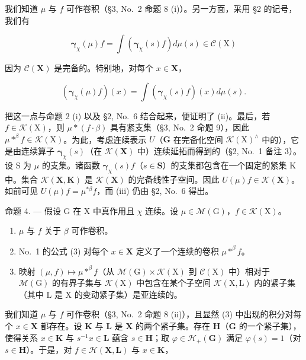 我们知道 \(\mu\) 与 \(f\) 可作卷积（§3, No.~2 命题 8 (i)）。另一方面，采用 §2 的记号，我们有

\[
\boldsymbol {\gamma} _ {\chi} (\mu) f = \int \left(\boldsymbol {\gamma} _ {\chi} (s) f\right) d \mu (s) \in \mathcal {C} (\mathrm{X})
\]

因为 \(\mathcal{C}(\mathbf{X})\) 是完备的。特别地，对每个 \(x\in \mathbf{X}\)，

\[
\left(\boldsymbol {\gamma} _ {\chi} (\mu) f\right) (x) = \int \left(\boldsymbol {\gamma} _ {\chi} (s) f\right) (x) d \mu (s).
\]

把这一点与命题 2 (i) 以及 §2, No.~6 结合起来，便证明了 (ii)。最后，若 \(f \in \mathcal{K}(\mathrm{X})\)，则 \(\mu * (f \cdot \beta)\) 具有紧支集（§3, No.~2 命题 9），因此 \(\mu *^{\beta} f \in \mathcal{K}(\mathrm{X})\)。为此，考虑连续表示 \(U\)（\(\mathbf{G}\) 在完备化空间 \(\mathcal{K}(\mathrm{X})^{\wedge}\) 中的），它是由连续算子 \(\pmb{\gamma}_{\chi}(s)\)（在 \(\mathcal{K}(\mathbf{X})\) 中）连续延拓而得到的（§2, No.~1 备注 3）。设 S 为 \(\mu\) 的支集。诸函数 \(\pmb{\gamma}_{\chi}(s)f\)（\(s \in \mathbf{S}\)）的支集都包含在一个固定的紧集 K 中。集合 \(\mathcal{K}(\mathbf{X}, \mathbf{K})\) 是 \(\mathcal{K}(\mathbf{X})\) 的完备线性子空间。因此 \(U(\mu)f \in \mathcal{K}(\mathbf{X})\)。如前可见 \(U(\mu)f = \mu^{*\beta}f\)，而 (iii) 仍由 §2, No.~6 得出。

命题 4. --- 假设 G 在 X 中真作用且 \(\chi\) 连续。设 \(\mu \in \mathcal{M}(\mathrm{G})\)，\(f \in \mathcal{K}(\mathrm{X})\)。

\begin{enumerate}
\def\labelenumi{(\roman{enumi})}
\item
  \(\mu\) 与 \(f\) 关于 \(\beta\) 可作卷积。
\item
  No.~1 的公式 (3) 对每个 \(x \in \mathbf{X}\) 定义了一个连续的卷积 \(\mu *^{\beta}f\)。
\item
  映射 \((\mu, f) \mapsto \mu *^{\beta}f\)（从 \(\mathcal{M}(\mathrm{G}) \times \mathcal{K}(\mathrm{X})\) 到 \(\mathcal{C}(\mathrm{X})\) 中）相对于 \(\mathcal{M}(\mathrm{G})\) 的有界子集与 \(\mathcal{K}(\mathrm{X})\) 中包含在某个子空间 \(\mathcal{K}(\mathrm{X}, \mathrm{L})\) 内的紧子集（其中 \(\mathrm{L}\) 是 \(\mathrm{X}\) 的变动紧子集）是亚连续的。
\end{enumerate}

我们知道 \(\mu\) 与 \(f\) 可作卷积（§3, No.~2 命题 8 (ii)），且显然 (3) 中出现的积分对每个 \(x \in \mathbf{X}\) 都存在。设 \(\mathbf{K}\) 与 \(\mathbf{L}\) 是 \(\mathbf{X}\) 的两个紧子集。存在 \(\mathbf{H}\)（\(\mathbf{G}\) 的一个紧子集），使得关系 \(x \in \mathbf{K}\) 与 \(s^{-1}x \in \mathbf{L}\) 蕴含 \(s \in \mathbf{H}\)；取 \(\varphi \in \mathcal{H}_{+}(\mathbf{G})\) 满足 \(\varphi(s) = 1\)（对 \(s \in \mathbf{H}\)）。于是，对 \(f \in \mathcal{H}(\mathbf{X}, \mathbf{L})\) 与 \(x \in \mathbf{K}\)，

